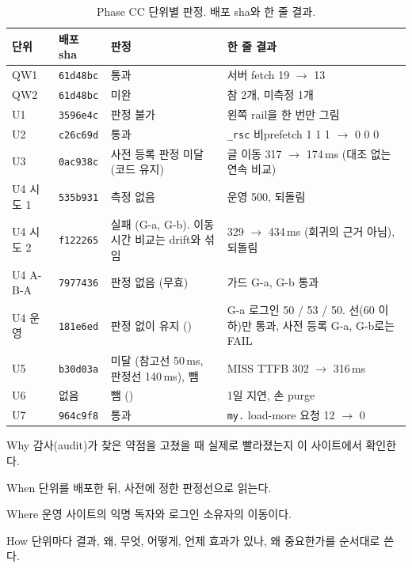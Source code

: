 \begin{table}[H]
  \caption{Phase CC 단위별 판정. 배포 sha와 한 줄 결과.}
  \label{tab:re-all}
  \centering\small
  \begin{tabularx}{\linewidth}{@{}L{1.8cm} L{2.4cm} L{2.8cm} Y@{}}
    \toprule
    단위 & 배포 sha & 판정 & 한 줄 결과 \\
    \midrule
    QW1 & \texttt{61d48bc} & 통과 & 서버 fetch 19 $\to$ 13 \\
    \midrule
    QW2 & \texttt{61d48bc} & 미완 & 참 2개, 미측정 1개 \\
    \midrule
    U1 & \texttt{3596e4c} & 판정 불가 & 왼쪽 rail을 한 번만 그림 \\
    \midrule
    U2 & \texttt{c26c69d} & 통과 & \texttt{\_rsc} 비prefetch 1 1 1 $\to$ 0 0 0 \\
    \midrule
    U3 & \texttt{0ac938c} & 사전 등록 판정 미달 (코드 유지) & 글 이동 317 $\to$ 174\,ms (대조 없는 연속 비교) \\
    \midrule
    U4 시도 1 & \texttt{535b931} & 측정 없음 & 운영 500, 되돌림 \\
    \midrule
    U4 시도 2 & \texttt{f122265} & 실패 (G-a, G-b). 이동 시간 비교는 drift와 섞임 & 329 $\to$ 434\,ms (회귀의 근거 아님), 되돌림 \\
    \midrule
    U4 A-B-A & \texttt{7977436} & 판정 없음 (무효) & 가드 G-a, G-b 통과 \\
    \midrule
    U4 운영 & \texttt{181e6ed} & 판정 없이 유지 () & G-a 로그인 50 / 53 / 50.  선(60 이하)만 통과, 사전 등록 G-a, G-b로는 FAIL \\
    \midrule
    U5 & \texttt{b30d03a} & 미달 (참고선 50\,ms, 판정선 140\,ms), 뺌 & MISS TTFB 302 $\to$ 316\,ms \\
    \midrule
    U6 & 없음 & 뺌 () & 1일 지연, 손 purge \\
    \midrule
    U7 & \texttt{964c9f8} & 통과 & \texttt{my.} load-more 요청 12 $\to$ 0 \\
    \bottomrule
  \end{tabularx}
\end{table}

\begin{inbrief}
  \item[Why] 감사(audit)가 찾은 약점을 고쳤을 때 실제로 빨라졌는지 이 사이트에서 확인한다.
  \item[When] 단위를 배포한 뒤, 사전에 정한 판정선으로 읽는다.
  \item[Where] 운영 사이트의 익명 독자와 로그인 소유자의 이동이다.
  \item[How] 단위마다 결과, 왜, 무엇, 어떻게, 언제 효과가 있나, 왜 중요한가를 순서대로 쓴다.
\end{inbrief}

